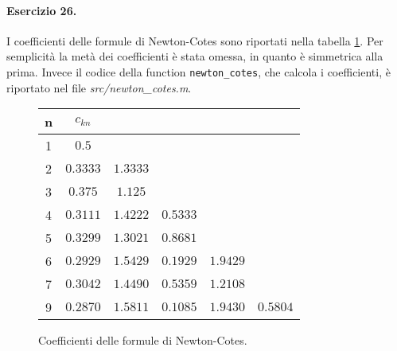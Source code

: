 \paragraph{Esercizio 26.} I coefficienti delle formule di Newton-Cotes sono riportati nella tabella \ref{fig:coefs}. Per semplicità la metà dei coefficienti è stata omessa, in quanto è simmetrica alla prima. Invece il codice della function \verb|newton_cotes|, che calcola i coefficienti, è riportato nel file \emph{src/newton\_cotes.m}.

\begin{figure}
  \centering
  \begin{tabular}{c| c c c c c}
    n & $c_{kn}$ & & & & \\
    \hline
    1 & $0.5$ & & & & \\
    2 & $0.3333$ & $1.3333$ & & & \\
    3 & $0.375$ & $1.125$ & & & \\
    4 & $0.3111$ & $1.4222$ & $0.5333$ & & \\
    5 & $0.3299$ & $1.3021$ & $0.8681$ & & \\
    6 & $0.2929$ & $1.5429$ & $0.1929$ & $1.9429$ & \\
    7 & $0.3042$ & $1.4490$ & $0.5359$ & $1.2108$ & \\
    9 & $0.2870$ & $1.5811$ & $0.1085$ & $1.9430$ & $0.5804$ \\
  \end{tabular}
  \caption{Coefficienti delle formule di Newton-Cotes.}
  \label{fig:coefs}
\end{figure}